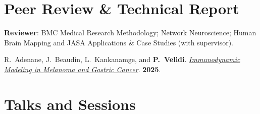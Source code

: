 \documentclass[9pt]{extarticle}
\begin{document}
\section{Peer Review \& Technical Report}
{\small \textbf{Reviewer}: BMC Medical Research Methodology; Network Neuroscience; Human Brain Mapping and JASA Applications \& Case Studies (with supervisor).}\par
{\small R.\ Adenane, J.\ Beaudin, L.\ Kankanamge, and \textbf{P.\ Velidi}. \href{https://punnettsquare9331.github.io/documents/immunodynamic-modeling-melanoma-gastric-cancer.pdf}{\textit{Immunodynamic Modeling in Melanoma and Gastric Cancer}}. \textbf{2025}.}

\newpage

\section{Talks and Sessions}
\end{document}
